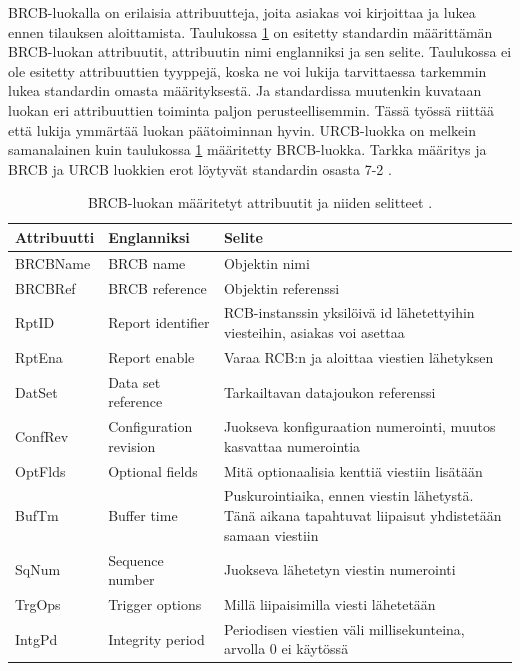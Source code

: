 BRCB-luokalla on erilaisia attribuutteja, joita asiakas voi kirjoittaa ja lukea ennen tilauksen aloittamista. Taulukossa \ref{tab:iec61850-brcb-class-definition} on esitetty standardin määrittämän BRCB-luokan attribuutit, attribuutin nimi englanniksi ja sen selite. Taulukossa ei ole esitetty attribuuttien tyyppejä, koska ne voi lukija tarvittaessa tarkemmin lukea standardin omasta määrityksestä. Ja standardissa muutenkin kuvataan luokan eri attribuuttien toiminta paljon perusteellisemmin. Tässä työssä riittää että lukija ymmärtää luokan päätoiminnan hyvin. URCB-luokka on melkein samanalainen kuin taulukossa \ref{tab:iec61850-brcb-class-definition} määritetty BRCB-luokka. Tarkka määritys ja BRCB ja URCB luokkien erot löytyvät standardin osasta 7-2 \cite[s.~93--118]{IEC61850-7-2}.

\begin{table}[ht!]
	\caption{BRCB-luokan määritetyt attribuutit ja niiden selitteet \cite[s.~94--103]{IEC61850-7-2}.}
	\label{tab:iec61850-brcb-class-definition}
	\begin{tabular}{l | l | l}
		\hline
		\textbf{Attribuutti} & \textbf{Englanniksi} & \textbf{Selite} \\
		\hline \hline
		BRCBName & BRCB name & Objektin nimi \\
		BRCBRef & BRCB reference & Objektin referenssi \\
		RptID & Report identifier & \parbox[t]{7.5cm}{RCB-instanssin yksilöivä id lähetettyihin viesteihin, asiakas voi asettaa} \\
		RptEna & Report enable & Varaa RCB:n ja aloittaa viestien lähetyksen \\
		DatSet & Data set reference & Tarkailtavan datajoukon referenssi \\
		ConfRev & Configuration revision & \parbox[t]{7.5cm}{Juokseva konfiguraation numerointi, muutos kasvattaa numerointia} \\
		OptFlds & Optional fields & Mitä optionaalisia kenttiä viestiin lisätään \\
		BufTm & Buffer time & \parbox[t]{7.5cm}{Puskurointiaika, ennen viestin lähetystä. Tänä aikana tapahtuvat liipaisut yhdistetään samaan viestiin} \\
		SqNum & Sequence number & Juokseva lähetetyn viestin numerointi \\
		TrgOps & Trigger options & Millä liipaisimilla viesti lähetetään \\
		IntgPd & Integrity period & \parbox[t]{7.5cm}{Periodisen viestien väli millisekunteina, arvolla 0 ei käytössä} \\

\end{tabular}
\end{table}
